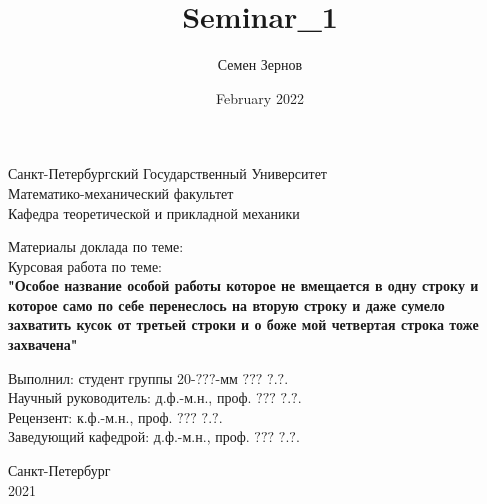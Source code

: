 \documentclass{article}
\title{Seminar_1}
\author{Семен Зернов}
\date{February 2022}
\begin{document}
    \pagestyle{empty}
    \begin{center}
        \LARGE
            {
                Санкт-Петербургский Государственный Университет \\ Математико-механический факультет \\ Кафедра теоретической и прикладной механики
            }
    \end{center}
    \vspace*{45mm}
    
    \begin{center}
        \Large
            {
                Материалы доклада по теме: \\
                Курсовая работа по теме: \\
                {\bf
                    "Особое название особой работы которое не вмещается в одну строку и которое само по себе перенеслось на вторую строку и даже сумело захватить кусок от третьей строки и о боже мой четвертая строка тоже захвачена" \\
                }
            }
    \end{center}
    
    \vspace*{35mm}
    
    \Large
        {
            \noindent
            Выполнил: \hfill студент группы 20-$???$-мм $???$ $?.?.$ \\
            Научный руководитель: \hfill д.ф.-м.н., проф. $???$ $?.?.$ \\
            Рецензент: \hfill к.ф.-м.н., проф. $???$ $?.?.$ \\
            Заведующий кафедрой: \hfill д.ф.-м.н., проф. $???$ $   ?.?.$ \\
        }
        
    \vspace*{65mm}
    
    \begin{center}
        Санкт-Петербург \\ 2021
    \end{center}
\end{document}
